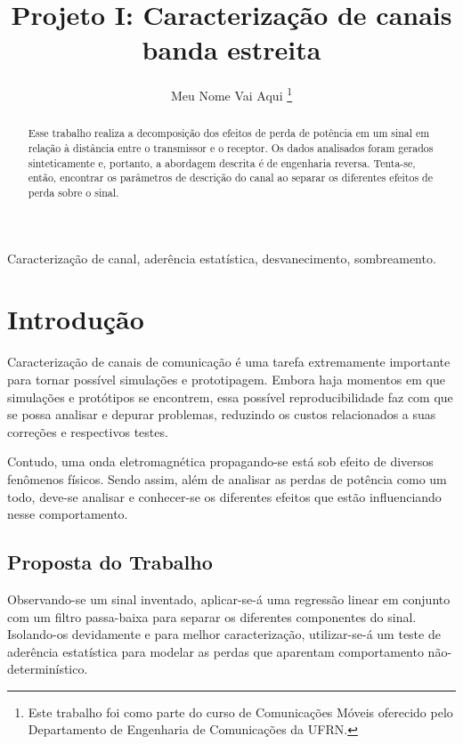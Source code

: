 \documentclass[journal,11pt,twocolumn]{IEEEtran}
\begin{document}
\title{Projeto I: Caracteriza\c{c}\~{a}o de canais banda estreita}


\author{Meu Nome Vai Aqui
    \thanks{Este trabalho foi como parte do curso de Comunicações Móveis oferecido pelo Departamento de Engenharia de Comunicações da UFRN.}
}


\maketitle

\begin{abstract}
Esse trabalho realiza a decomposição dos efeitos de perda de potência em um sinal em relação à distância entre o transmissor e o receptor. Os dados analisados foram gerados sinteticamente e, portanto, a abordagem descrita é de engenharia reversa. Tenta-se, então, encontrar os parâmetros de descrição do canal ao separar os diferentes efeitos de perda sobre o sinal.
\end{abstract}

\begin{keywords}
Caracterização de canal, aderência estatística, desvanecimento, sombreamento.
\end{keywords}


\section{Introdução}
Caracterização de canais de comunicação é uma tarefa extremamente importante para tornar possível simulações e prototipagem. Embora haja momentos em que simulações e protótipos se encontrem, essa possível reproducibilidade faz com que se possa analisar e depurar problemas, reduzindo os custos relacionados a suas correções e respectivos testes. 

Contudo, uma onda eletromagnética propagando-se está sob efeito de diversos fenômenos físicos. Sendo assim, além de analisar as perdas de potência como um todo, deve-se analisar e conhecer-se os diferentes efeitos que estão influenciando nesse comportamento.

\subsection{Proposta do Trabalho}
Observando-se um sinal inventado, aplicar-se-á uma regressão linear em conjunto com um filtro passa-baixa para separar os diferentes componentes do sinal. Isolando-os devidamente e para melhor caracterização, utilizar-se-á um teste de aderência estatística para modelar as perdas que aparentam comportamento não-determinístico.
\end{document}
